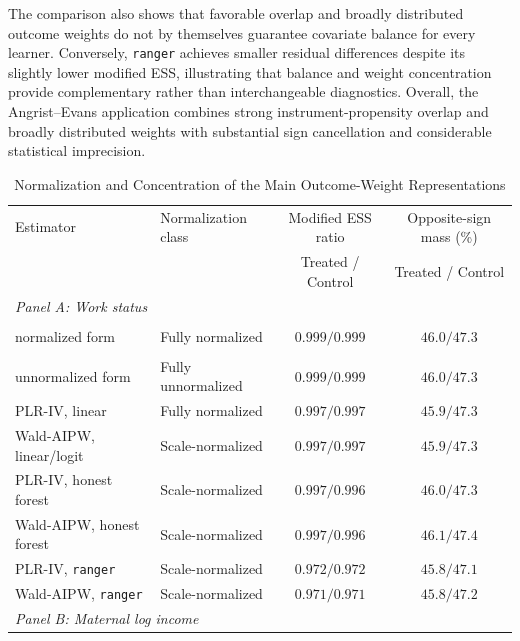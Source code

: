 \documentclass[12pt, a4paper, oneside]{article}
\theoremstyle{plain}
\theoremstyle{definition}
\begin{document}
The comparison also shows that favorable overlap and broadly distributed
outcome weights do not by themselves guarantee covariate balance for every
learner. Conversely, \texttt{ranger} achieves smaller residual differences
despite its slightly lower modified ESS, illustrating that balance and weight
concentration provide complementary rather than interchangeable diagnostics.
Overall, the Angrist–Evans application combines strong instrument-propensity overlap and broadly distributed weights with substantial sign cancellation and considerable statistical imprecision. 




\begin{table}[H]
\centering
\caption{Normalization and Concentration of the Main Outcome-Weight
Representations}
\label{tab:child_weights}
\scriptsize
\setlength{\tabcolsep}{4.2pt}
\renewcommand{\arraystretch}{1.08}
\begin{tabular}{llcc}
\toprule
Estimator & Normalization class &
\multicolumn{1}{c}{Modified ESS ratio} &
\multicolumn{1}{c}{Opposite-sign mass (\%)} \\
& & Treated / Control & Treated / Control \\
\midrule
\multicolumn{4}{l}{\textit{Panel A: Work status}} \\
\shortstack[l]{\(\widehat{\tau}^{ml}_{u}\), representative\\normalized form}
    & Fully normalized
    & \(0.999/0.999\) & \(46.0/47.3\) \\
\shortstack[l]{\(\widehat{\tau}^{ml}_{a}\), representative\\unnormalized form}
    & Fully unnormalized
    & \(0.999/0.999\) & \(46.0/47.3\) \\
PLR-IV, linear
    & Fully normalized
    & \(0.997/0.997\) & \(45.9/47.3\) \\
Wald-AIPW, linear/logit
    & Scale-normalized
    & \(0.997/0.997\) & \(45.9/47.3\) \\
PLR-IV, honest forest
    & Scale-normalized
    & \(0.997/0.996\) & \(46.0/47.3\) \\
Wald-AIPW, honest forest
    & Scale-normalized
    & \(0.997/0.996\) & \(46.1/47.4\) \\
PLR-IV, \texttt{ranger}
    & Scale-normalized
    & \(0.972/0.972\) & \(45.8/47.1\) \\
Wald-AIPW, \texttt{ranger}
    & Scale-normalized
    & \(0.971/0.971\) & \(45.8/47.2\) \\
\midrule
\multicolumn{4}{l}{\textit{Panel B: Maternal log income}} \\

\end{tabular}
\end{table}
\end{document}
